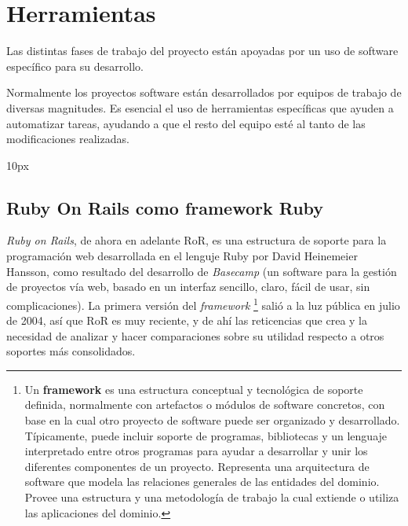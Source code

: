 %
%
\chapter[Herramientas]{
	Herramientas
	\label{cap:herramientas}
}

Las distintas fases de trabajo del proyecto están apoyadas por un uso de software específico para su desarrollo.

Normalmente los proyectos software están desarrollados por equipos de trabajo de diversas magnitudes. Es esencial el uso de herramientas específicas que ayuden a automatizar tareas, ayudando a que el resto del equipo esté al tanto de las modificaciones realizadas.

\begin{center}{
	\fboxsep 10px
	}\end{center}

\section{Ruby On Rails como framework Ruby} %
  \label{sec:ruby_on_rails_como_framework_ruby}
  
  {\it Ruby on Rails}, de ahora en adelante RoR, es una estructura de soporte para la programación web desarrollada en el lenguje Ruby por David Heinemeier Hansson, como resultado del desarrollo de {\it Basecamp} (un software para la gestión de proyectos vía web, basado en un interfaz sencillo, claro, fácil de usar, sin complicaciones). La primera versión del {\it framework} \footnote{Un {\bf framework} es una estructura conceptual y tecnológica de soporte definida, normalmente con artefactos o módulos de software concretos, con base en la cual otro proyecto de software puede ser organizado y desarrollado. Típicamente, puede incluir soporte de programas, bibliotecas y un lenguaje interpretado entre otros programas para ayudar a desarrollar y unir los diferentes componentes de un proyecto. Representa una arquitectura de software que modela las relaciones generales de las entidades del dominio. Provee una estructura y una metodología de trabajo la cual extiende o utiliza las aplicaciones del dominio.} salió a la luz pública en julio de 2004, así que RoR es muy reciente, y de ahí las reticencias que crea y la necesidad de analizar y hacer comparaciones sobre su utilidad respecto a otros soportes más consolidados.
  
